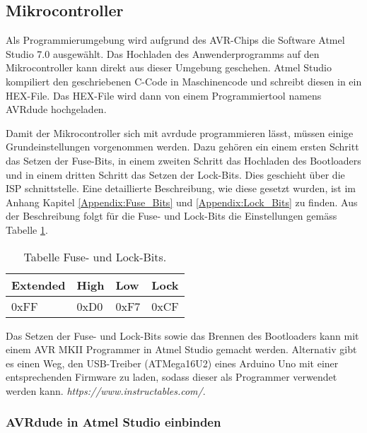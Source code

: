 \subsection{Mikrocontroller}
\label{subsec:Inbetriebnahme_Mikrocontroller}

Als Programmierumgebung wird aufgrund des AVR-Chips die Software Atmel Studio 7.0 ausgewählt. Das Hochladen des Anwenderprogramms auf den Mikrocontroller kann direkt aus dieser Umgebung geschehen. 
Atmel Studio kompiliert den geschriebenen C-Code in Maschinencode und schreibt diesen in ein HEX-File. Das HEX-File wird dann von einem Programmiertool namens AVRdude hochgeladen.\cite{verschiedene_autoren_avrdude_2019}

Damit der Mikrocontroller sich mit avrdude programmieren lässt, müssen einige Grundeinstellungen vorgenommen werden. Dazu gehören ein einem ersten Schritt das Setzen der Fuse-Bits, in einem zweiten Schritt das Hochladen des Bootloaders und in einem dritten Schritt das Setzen der Lock-Bits. Dies geschieht über die ISP schnittstelle. Eine detaillierte Beschreibung, wie diese gesetzt wurden, ist im Anhang Kapitel \ref{Appendix:Fuse_Bits} und \ref{Appendix:Lock_Bits} zu finden. Aus der Beschreibung folgt für die Fuse- und Lock-Bits die Einstellungen gemäss Tabelle \ref{tab:Fuse_und_Lock-Bits}.

\begin{table}[h!]
\center
\begin{tabular}{|l|l|l|l|}
\hline
\textbf{Extended} & \textbf{High} & \textbf{Low} & \textbf{Lock}\\
\hline
0xFF & 0xD0 & 0xF7 & 0xCF\\
\hline
\end{tabular}
\caption{Tabelle Fuse- und Lock-Bits.}
\label{tab:Fuse_und_Lock-Bits}
\end{table}

Das Setzen der Fuse- und Lock-Bits sowie das Brennen des Bootloaders kann mit einem AVR MKII Programmer in Atmel Studio gemacht werden. Alternativ gibt es einen Weg, den USB-Treiber (ATMega16U2) eines Arduino Uno mit einer entsprechenden Firmware zu laden, sodass dieser als Programmer verwendet werden kann. \textit{https://www.instructables.com/}. \cite{vidmofollow_turn_2017}

\subsubsection{AVRdude in Atmel Studio einbinden}\label{subsubsec:avrdude_in_atmelstudio_einbinden}

